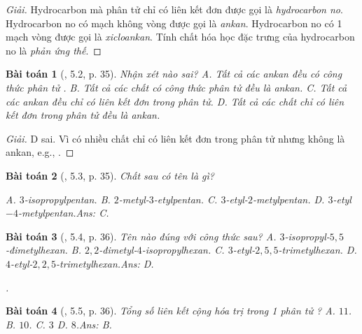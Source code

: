 \documentclass{article}
\newtheorem{baitoan}{Bài toán}
\begin{document}
\begin{proof}[Giải]
	Hydrocarbon mà phân tử chỉ có liên kết đơn được gọi là \textit{hydrocarbon no}. Hydrocarbon no có mạch không vòng được gọi là \textit{ankan}. Hydrocarbon no có 1 mạch vòng được gọi là \textit{xicloankan}. Tính chất hóa học đặc trưng của hydrocarbon no là \textit{phản ứng thế}.
\end{proof}

\begin{baitoan}[\cite{SBT_Hoa_Hoc_11_co_ban}, 5.2, p. 35]
	Nhận xét nào sai? {\sf A.} Tất cả các ankan đều có công thức phân tử \emph{}. {\sf B.} Tất cả các chất có công thức phân tử \emph{} đều là ankan. {\sf C.} Tất cả các ankan đều chỉ có liên kết đơn trong phân tử. {\sf D.} Tất cả các chất chỉ có liên kết đơn trong phân tử đều là ankan.
\end{baitoan}

\begin{proof}[Giải]
	{\sf D} sai. Vì có nhiều chất chỉ có liên kết đơn trong phân tử nhưng không là ankan, e.g., .
\end{proof}

\begin{baitoan}[\cite{SBT_Hoa_Hoc_11_co_ban}, 5.3, p. 35]
	Chất sau có tên là gì?
	\begin{center}
	\end{center}
	{\sf A.} $3$-isopropylpentan. {\sf B.} $2$-metyl-$3$-etylpentan. {\sf C.} $3$-etyl-$2$-metylpentan. {\sf D.} $3$-etyl$-4$-metylpentan.\hfill{\sf Ans: C.}
\end{baitoan}

\begin{baitoan}[\cite{SBT_Hoa_Hoc_11_co_ban}, 5.4, p. 36]
	Tên nào đúng với công thức sau? {\sf A.} $3$-isopropyl-$5,5$-đimetylhexan. {\sf B.} $2,2$-đimetyl-$4$-isopropylhexan. {\sf C.} $3$-etyl-$2,5,5$-trimetylhexan. {\sf D.} $4$-etyl-$2,2,5$-trimetylhexan.\hfill{\sf Ans: D.}
	\begin{center}
		.
	\end{center}
\end{baitoan}

\begin{baitoan}[\cite{SBT_Hoa_Hoc_11_co_ban}, 5.5, p. 36]
	Tổng số liên kết cộng hóa trị trong 1 phân tử \emph{}? {\sf A.} $11$. {\sf B.} $10$. {\sf C.} $3$ {\sf D.} $8$.\hfill{\sf Ans: B.}
\end{baitoan}
\end{document}
